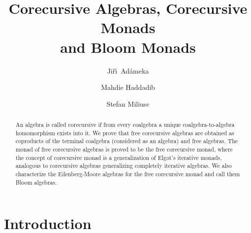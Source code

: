 \documentclass{LMCS}
\theoremstyle{plain}
\theoremstyle{definition}
\numberwithin{equation}{section}
\begin{document}
\title[Corecursive Algebras, Corecursive Monads and Bloom Monads]{Corecursive Algebras, Corecursive Monads \\and Bloom Monads}




\author[J.~Ad\'amek]{Ji\v{r}\'\i\ Ad\'amek\rsuper a}
\address{{\lsuper a}Institut f\"ur Theoretische Informatik, Technische Universit\"at Braunschweig, Germany}

\author[M.~Haddadi]{Mahdie Haddadi\rsuper b}
\address{{\lsuper b}Department of Mathematics, Statistics and Computer Science, Semnan University, Semnan, Iran}

\author[S.~Milius]{Stefan Milius\rsuper c}
\address{{\lsuper c}Lehrstuhl f\"ur Theoretische Informatik, Friedrich-Alexander-Universit\"at Erlangen-N\"urnberg, Germany}




\begin{abstract}
An algebra is called corecursive if from every coalgebra a unique coalgebra-to-algebra homomorphism exists into it. We prove that free corecursive algebras are obtained as coproducts of the terminal coalgebra (considered as an algebra) and free algebras. The monad of free corecursive algebras is proved to be the free corecursive monad, where the concept of corecursive monad is a generalization of Elgot's iterative monads, analogous to corecursive algebras generalizing completely iterative algebras. We also characterize the Eilenberg-Moore algebras for the free corecursive monad and call them Bloom algebras.
\end{abstract}

\maketitle



\section{Introduction}
\end{document}
